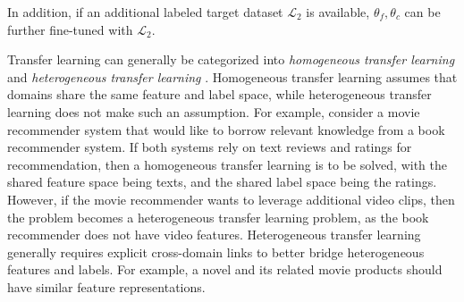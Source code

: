 \documentclass[11pt]{article}
\begin{document}
In addition, if an additional labeled target dataset $\mathcal{L}_2$ is available, $\theta_f, \theta_c$ can be further fine-tuned with $\mathcal{L}_2$.

Transfer learning can generally be categorized into \textit{homogeneous transfer learning} and \textit{heterogeneous transfer learning} \cite{Yilun-pan2010survey}. Homogeneous transfer learning assumes that domains share the same feature and label space, while heterogeneous transfer learning does not make such an assumption. For example, consider a movie recommender system that would like to borrow relevant knowledge from a book recommender system. If both systems rely on text reviews and ratings for recommendation, then a homogeneous transfer learning is to be solved, with the shared feature space being texts, and the shared label space being the ratings. However, if the movie recommender wants to leverage additional video clips, then the problem becomes a heterogeneous transfer learning problem, as the book recommender does not have video features. Heterogeneous transfer learning generally requires explicit cross-domain links to better bridge heterogeneous features and labels. For example, a novel and its related movie products should have similar feature representations.
\end{document}
